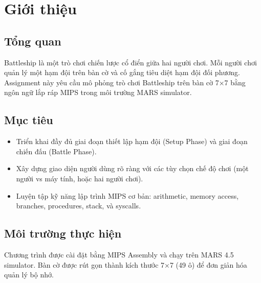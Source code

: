 \section{Giới thiệu}

\subsection{Tổng quan}

Battleship là một trò chơi chiến lược cổ điển giữa hai người chơi. Mỗi người chơi quản lý một hạm đội trên bàn cờ và cố gắng tiêu diệt hạm đội đối phương. Assignment này yêu cầu mô phỏng trò chơi Battleship trên bàn cờ 7×7 bằng ngôn ngữ lắp ráp MIPS trong môi trường MARS simulator.

\subsection{Mục tiêu}

\begin{itemize}
    \item Triển khai đầy đủ giai đoạn thiết lập hạm đội (Setup Phase) và giai đoạn chiến đấu (Battle Phase).
    \item Xây dựng giao diện người dùng rõ ràng với các tùy chọn chế độ chơi (một người vs máy tính, hoặc hai người chơi).
    \item Luyện tập kỹ năng lập trình MIPS cơ bản: arithmetic, memory access, branches, procedures, stack, và syscalls.
\end{itemize}

\subsection{Môi trường thực hiện}

Chương trình được cài đặt bằng MIPS Assembly và chạy trên MARS 4.5 simulator. Bàn cờ được rút gọn thành kích thước 7×7 (49 ô) để đơn giản hóa quản lý bộ nhớ.
